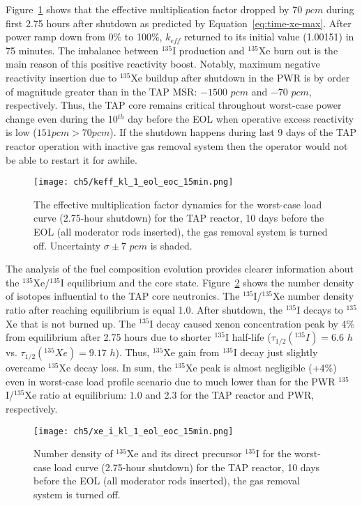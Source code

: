 Figure~\ref{fig:lf-tap-keff-eol-eoc-no-15} shows that the effective 
multiplication factor dropped by 70 $pcm$ during first 2.75 hours after 
shutdown as predicted by Equation~\ref{eq:time-xe-max}. After power ramp down 
from 0\% to 100\%, $k_{eff}$ returned to its initial value (1.00151) in 75 
minutes. The imbalance between $^{135}$I production and $^{135}$Xe burn out is 
the main reason of this positive reactivity boost. Notably, maximum negative 
reactivity insertion due to $^{135}$Xe buildup after shutdown in the 
\gls{PWR} is by order of magnitude greater than in the \gls{TAP} \gls{MSR}: 
$-1500$ $pcm$ \cite{rykhlevskii_impact_2019} and $-70$ $pcm$, respectively.
Thus, the \gls{TAP} core remains critical throughout worst-case power change 
even during the 10$^{th}$ day before the \gls{EOL} when operative excess 
reactivity is low ($151pcm>70pcm$). If the shutdown happens during last 9 days 
of the \gls{TAP} reactor operation with inactive gas removal system then the 
operator would not be able to restart it for awhile.
\begin{figure}[htp!] %
	\centering
	\texttt{[image: ch5/keff\_kl\_1\_eol\_eoc\_15min.png]}
	\caption{The effective multiplication factor dynamics for the worst-case 
		load curve (2.75-hour shutdown) for the \gls{TAP} reactor, 10 days 
		before the \gls{EOL} (all moderator rods inserted), the gas removal 
		system is turned off. Uncertainty $\sigma\pm7$ $pcm$ is shaded.}
	\label{fig:lf-tap-keff-eol-eoc-no-15}
\end{figure}


The analysis of the fuel composition evolution provides clearer information 
about the $^{135}$Xe/$^{135}$I equilibrium and the core state. 
Figure~\ref{fig:lf-tap-xe-i-eol-eoc-no-15} shows the number density of 
isotopes influential to the \gls{TAP} core neutronics. The 
$^{135}$I/$^{135}$Xe number density ratio after reaching equilibrium is equal 
1.0. After shutdown, the $^{135}$I decays to $^{135}$Xe that is not burned up. 
The $^{135}$I decay caused xenon concentration 
peak by 4\% from equilibrium after 2.75 hours due to shorter $^{135}$I 
half-life ($\tau_{1/2}(^{135}I)=6.6$ $h$ vs. $\tau_{1/2}(^{135}Xe)=9.17$ 
$h$). Thus, $^{135}$Xe gain from $^{135}$I decay just slightly overcame 
$^{135}$Xe decay loss. In sum, the $^{135}$Xe peak is almost negligible (+4\%) 
even in worst-case load profile scenario due to much lower than for the 
\gls{PWR} $^{135}$I/$^{135}$Xe ratio at equilibrium: 1.0 and 2.3 
\cite{rykhlevskii_impact_2019} for the \gls{TAP} reactor and 
\gls{PWR}, respectively.
\begin{figure}[htp!] %
	\centering
	\texttt{[image: ch5/xe\_i\_kl\_1\_eol\_eoc\_15min.png]}
	\caption{Number density of $^{135}$Xe and its direct precursor $^{135}$I 
	for the worst-case load curve (2.75-hour shutdown) for the \gls{TAP} 
	reactor, 10 days before the \gls{EOL} (all moderator rods inserted), the 
	gas removal system is turned off.}
	\label{fig:lf-tap-xe-i-eol-eoc-no-15}
\end{figure}

